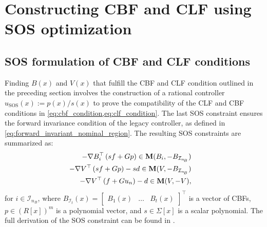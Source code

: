 \documentclass[lettersize,journal]{IEEEtran}
\newcommand{\afterReviewChangedBox}[1]{{\color{orange}#1}}
\begin{document}
\section{Constructing CBF and CLF using SOS optimization} \label{sec:sos_optimization}

\subsection{SOS formulation of CBF and CLF conditions} \label{sec:cbf_and_clf_sos_constraints}


\afterReviewChangedBox{Finding $B(x)$ and $V(x)$ that fulfill the CBF and CLF condition outlined in the preceding section involves the construction of a rational controller $u_\text{SOS}(x) := p(x) / s(x)$ to prove the compatibility of the CLF and CBF conditions in \cref{eq:cbf_condition,eq:clf_condition}.
The last SOS constraint ensures the forward invariance condition of the legacy controller, as defined in \cref{eq:forward_invariant_nominal_region}.
The resulting SOS constraints are summarized as:
\begin{subequations} \label{eq:sos_constr}
   \begin{align}
      \begin{split} \label{eq:sos_constraint_cbf}
         -\nabla B_i^\top \left ( s f + G p \right ) &\in \textbf M(B_i, -B_{\mathcal I_{n_{\!B}}})
      \end{split} \\
      \begin{split} \label{eq:sos_constraint_clf}
         -\nabla V^\top \left ( s f + G p \right ) - s d &\in \textbf M(V, -B_{\mathcal I_{n_{\!B}}})
      \end{split} \\
      \begin{split} \label{eq:sos_constraint_nom}
         -\nabla V^\top \left ( f + G u_n \right ) - d &\in \textbf M(V, -V),
      \end{split}
   \end{align}
\end{subequations}
for $i \in \mathcal I_{n_{\!B}}$, where $B_{\mathcal I_t}(x) = \begin{bmatrix}B_1(x) & \hdots & B_t(x)\end{bmatrix}^\top$ is a vector of CBFs, $p \in (R[x])^m$ is a polynomial vector, and $s \in \Sigma[x]$ is a scalar polynomial.
The full derivation of the SOS constraint can be found in \cite{schneeberger2024advanced}.}
\end{document}
